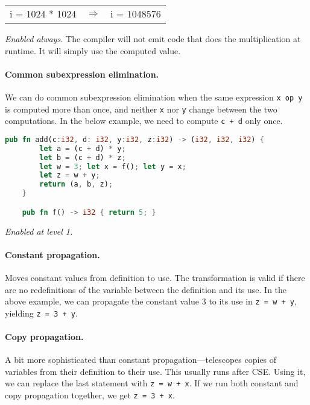 \begin{center}
\vspace*{-1em}
\begin{tabular}{lll}
i = 1024 * 1024 &
$\Longrightarrow$ &
i = 1048576
\end{tabular}
\end{center}

\noindent \emph{Enabled always.} The compiler will not emit
code that does the multiplication at runtime. It will simply use the
computed value.

\paragraph{Common subexpression elimination.} We can do common subexpression elimination
when the same expression {\tt x op y} is computed more than once, and
neither {\tt x} nor {\tt y} change between the two computations. In the
below example, we need to compute {\tt c + d} only once.


\begin{lstlisting}[language=Rust]
    pub fn add(c:i32, d: i32, y:i32, z:i32) -> (i32, i32, i32) {
        let a = (c + d) * y;
        let b = (c + d) * z;
        let w = 3; let x = f(); let y = x;
        let z = w + y;
        return (a, b, z);
    }

    pub fn f() -> i32 { return 5; }
\end{lstlisting}

\noindent \emph{Enabled at level 1.}

\paragraph{Constant propagation.} Moves constant values from definition to
use. The transformation is valid if there are no redefinitions of the
variable between the definition and its use. In the above example,
we can propagate the constant value 3 to its use in {\tt z = w + y},
yielding {\tt z = 3 + y}.

\paragraph{Copy propagation.} A bit more sophisticated than constant
propagation---telescopes copies of variables from their definition to
their use. This usually runs after CSE. Using it, we can replace the
last statement with {\tt z = w + x}. If we run both constant and copy
propagation together, we get {\tt z = 3 + x}.

